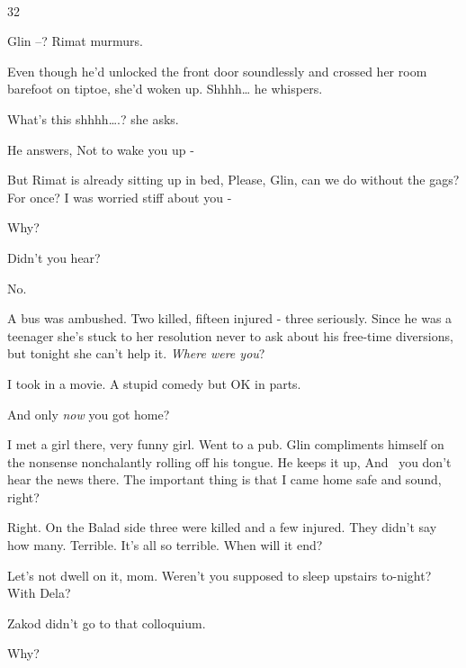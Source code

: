 \documentclass[letterpaper]{article}
\begin{document}
~

32 

{\textquotedbl}Glin --?{\textquotedbl} Rimat murmurs. 

Even though he'd unlocked the front door soundlessly and crossed her room barefoot on tiptoe, she'd woken up.
{\textquotedbl}Shhhh{\dots}{\textquotedbl} he whispers. 

{\textquotedbl}What's this shhhh{\dots}.?{\textquotedbl} she asks.

He answers, {\textquotedbl}Not to wake you up -{\textquotedbl} 

But Rimat is already sitting up in bed, {\textquotedbl}Please, Glin, can we do without the gags? For once? I was worried
stiff about you -{\textquotedbl} 

{\textquotedbl}Why?{\textquotedbl} 

{\textquotedbl}Didn't you hear?{\textquotedbl} 

{\textquotedbl}No.{\textquotedbl} 

{\textquotedbl}A bus was ambushed. Two killed, fifteen injured - three seriously.{\textquotedbl} Since he was a teenager
she's stuck to her resolution never\textcolor[rgb]{0.0,0.4392157,0.7529412}{ }to ask about his
free\textcolor[rgb]{0.0,0.4392157,0.7529412}{{}-}time diversions, but tonight she can't help it.
{\textquotedbl}\textit{Where were you}?{\textquotedbl} 

{\textquotedbl}I took in a movie. A stupid\textcolor[rgb]{0.0,0.4392157,0.7529412}{ }comedy but OK in
parts.{\textquotedbl} 

{\textquotedbl}And only \textit{now} you got home?{\textquotedbl} ~

{\textquotedbl}I met a girl there, very funny girl. Went to a pub.{\textquotedbl} Glin compliments himself on the
nonsense nonchalantly rolling off his tongue. He keeps it up, {\textquotedbl}And \ you don't hear the news there. The
important thing is that I came home safe and sound, right?{\textquotedbl} 

{\textquotedbl}Right. On the Balad side three were killed and a few injured. They didn't say how many. Terrible. It's
all so terrible. When will it end?{\textquotedbl} 

{\textquotedbl}Let's not dwell on it, mom. Weren't you supposed to sleep upstairs to-night? With Dela?{\textquotedbl} 

{\textquotedbl}Zakod didn't go to that colloquium.{\textquotedbl} 

{\textquotedbl}Why?{\textquotedbl} 
\end{document}
